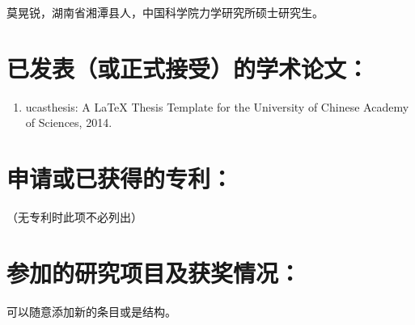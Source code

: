 莫晃锐，湖南省湘潭县人，中国科学院力学研究所硕士研究生。

\section*{已发表（或正式接受）的学术论文：}

 {
  \setlist[enumerate]{}%
  \begin{enumerate}[nosep]
      \item ucasthesis: A LaTeX Thesis Template for the University of Chinese Academy of Sciences, 2014.
  \end{enumerate}
 }

\section*{申请或已获得的专利：}

（无专利时此项不必列出）

\section*{参加的研究项目及获奖情况：}

可以随意添加新的条目或是结构。

\cleardoublepage[plain]%
